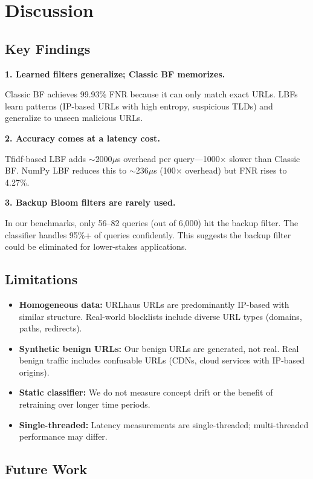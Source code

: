 \documentclass[11pt,a4paper]{article}
\begin{document}
\section{Discussion}

\subsection{Key Findings}

\textbf{1. Learned filters generalize; Classic BF memorizes.}

Classic BF achieves 99.93\% FNR because it can only match exact URLs. LBFs learn patterns (IP-based URLs with high entropy, suspicious TLDs) and generalize to unseen malicious URLs.

\textbf{2. Accuracy comes at a latency cost.}

Tfidf-based LBF adds $\sim$2000$\mu$s overhead per query---1000$\times$ slower than Classic BF. NumPy LBF reduces this to $\sim$236$\mu$s (100$\times$ overhead) but FNR rises to 4.27\%.

\textbf{3. Backup Bloom filters are rarely used.}

In our benchmarks, only 56--82 queries (out of 6,000) hit the backup filter. The classifier handles 95\%+ of queries confidently. This suggests the backup filter could be eliminated for lower-stakes applications.

\subsection{Limitations}

\begin{itemize}
    \item \textbf{Homogeneous data:} URLhaus URLs are predominantly IP-based with similar structure. Real-world blocklists include diverse URL types (domains, paths, redirects).
    \item \textbf{Synthetic benign URLs:} Our benign URLs are generated, not real. Real benign traffic includes confusable URLs (CDNs, cloud services with IP-based origins).
    \item \textbf{Static classifier:} We do not measure concept drift or the benefit of retraining over longer time periods.
    \item \textbf{Single-threaded:} Latency measurements are single-threaded; multi-threaded performance may differ.
\end{itemize}

\subsection{Future Work}
\end{document}
